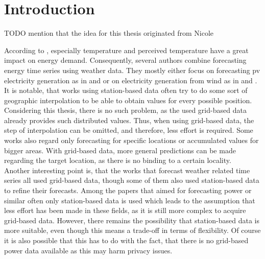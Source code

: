 \chapter{Introduction}
\label{ch:Introduction}

TODO mention that the idea for this thesis originated from Nicole

According to , especially temperature and perceived temperature have a great impact on energy demand. Consequently, several authors combine forecasting energy time series using weather data. They mostly either focus on forecasting \gls{pv} electricity generation as in  and  or on electricity generation from wind as in  and .\\

It is notable, that works using station-based data often try to do some sort of geographic interpolation to be able to obtain values for every possible position. Considering this thesis, there is no such problem, as the used grid-based data already provides such distributed values. Thus, when using grid-based data, the step of interpolation can be omitted, and therefore, less effort is required. Some works also regard only forecasting for specific locations or accumulated values for bigger areas. With grid-based data, more general predictions can be made regarding the target location, as there is no binding to a certain locality.\\

Another interesting point is, that the works that forecast weather related time series all used grid-based data, though some of them also used station-based data to refine their forecasts. Among the papers that aimed for forecasting power or similar often only station-based data is used which leads to the assumption that less effort has been made in these fields, as it is still more complex to acquire grid-based data. However, there remains the possibility that station-based data is more suitable, even though this means a trade-off in terms of flexibility. Of course it is also possible that this has to do with the fact, that there is no grid-based power data available as this may harm privacy issues.\\


